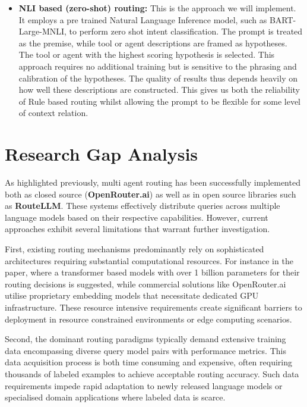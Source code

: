 \begin{itemize}
    \item \textbf{NLI based (zero-shot) routing:} This is the approach we will implement. It employs a pre trained Natural Language Inference model, such as BART-Large-MNLI, to perform zero shot intent classification. The prompt is treated as the premise, while tool or agent descriptions are framed as hypotheses. The tool or agent with the highest scoring hypothesis is selected. This approach requires no additional training but is sensitive to the phrasing and calibration of the hypotheses. The quality of results thus depends heavily on how well these descriptions are constructed. This gives us both the reliability of Rule based routing whilst allowing the prompt to be flexible for some level of context relation.
\end{itemize}

\section{Research Gap Analysis}

As highlighted previously, multi agent routing has been successfully implemented both as closed source (\textbf{OpenRouter.ai}) as well as in open source libraries such as \textbf{RouteLLM}. These systems effectively distribute queries across multiple language models based on their respective capabilities. However, current approaches exhibit several limitations that warrant further investigation.

First, existing routing mechanisms predominantly rely on sophisticated architectures requiring substantial computational resources. For instance in the paper, \cite{jiang2023activeretrievalaugmentedgeneration} where a transformer based models with over 1 billion parameters for their routing decisions is suggested, while commercial solutions like OpenRouter.ai utilise proprietary embedding models that necessitate dedicated GPU infrastructure. These resource intensive requirements create significant barriers to deployment in resource constrained environments or edge computing scenarios.

Second, the dominant routing paradigms typically demand extensive training data encompassing diverse query model pairs with performance metrics. This data acquisition process is both time consuming and expensive, often requiring thousands of labeled examples to achieve acceptable routing accuracy. Such data requirements impede rapid adaptation to newly released language models or specialised domain applications where labeled data is scarce.

